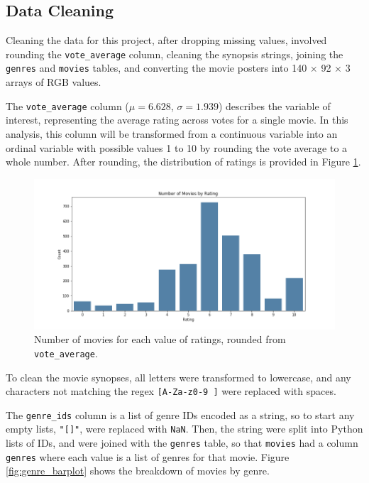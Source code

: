 \documentclass[12pt, oneside]{article}   	%
\begin{document}
\subsection{Data Cleaning}

Cleaning the data for this project, after dropping missing values, involved rounding the \texttt{vote\_average} column, cleaning the synopsis strings, joining the \texttt{genres} and \texttt{movies} tables, and converting the movie posters into 140 $\times$ 92 $\times$ 3 arrays of RGB values.

The \texttt{vote\_average} column ($\mu = 6.628$, $\sigma = 1.939$) describes the variable of interest, representing the average rating across votes for a single movie. In this analysis, this column will be transformed from a continuous variable into an ordinal variable with possible values 1 to 10 by rounding the vote average to a whole number. After rounding, the distribution of ratings is provided in Figure \ref{fig:rating_barplot}.

\begin{figure}%
\includegraphics[width=\textwidth]{rating_barplot}
\caption{\label{fig:rating_barplot}Number of movies for each value of ratings, rounded from \texttt{vote\_average}.}
\end{figure}

To clean the movie synopses, all letters were transformed to lowercase, and any characters not matching the regex \texttt{[A-Za-z0-9 ]} were replaced with spaces.

The \texttt{genre\_ids} column is a list of genre IDs encoded as a string, so to start any empty lists, \texttt{"[]"}, were replaced with \texttt{NaN}. Then, the string were split into Python lists of IDs, and were joined with the \texttt{genres} table, so that \texttt{movies} had a column \texttt{genres} where each value is a list of genres for that movie. Figure \ref{fig:genre_barplot} shows the breakdown of movies by genre.
\end{document}
